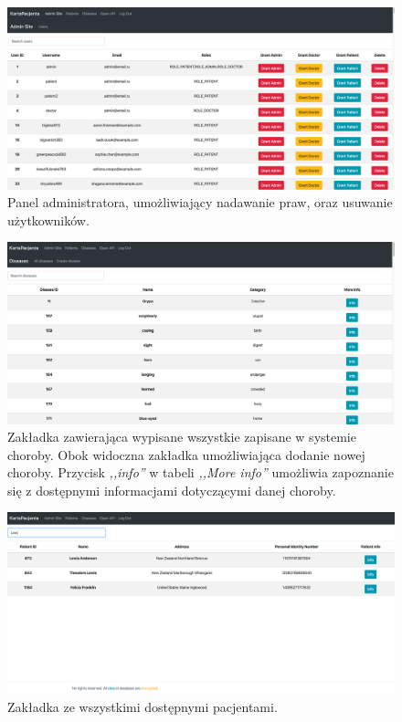 \begin{figure}[H]
\centering
\includegraphics[width=15cm]{pictures/service/02-admin_panel}
\caption{Panel administratora, umożliwiający nadawanie praw, oraz usuwanie użytkowników.}
\end{figure}

\begin{figure}[H]
\centering
\includegraphics[width=15cm]{pictures/service/04-choroby}
\caption{Zakładka zawierająca wypisane wszystkie zapisane w systemie choroby.
Obok widoczna zakładka umożliwiająca dodanie nowej choroby. Przycisk \textit{,,info''} w tabeli \textit{,,More info''}
umożliwia zapoznanie się z dostępnymi informacjami dotyczącymi danej choroby.}
\end{figure}

\begin{figure}[H]
\centering
\includegraphics[width=15cm]{pictures/service/03-patients}
\caption{Zakładka ze wszystkimi dostępnymi pacjentami.}
\end{figure}

